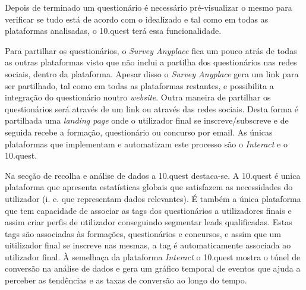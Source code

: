 Depois de terminado um questionário é necessário pré-visualizar o mesmo para verificar se tudo está de acordo com o idealizado e tal como em todas as plataformas analisadas, o 10.quest terá essa funcionalidade.

Para partilhar os questionários, o \textit{Survey Anyplace} fica um pouco atrás de todas as outras plataformas visto que não inclui a partilha dos questionários nas redes sociais, dentro da plataforma. Apesar disso o \textit{Survey Anyplace} gera um link para ser partilhado, tal como em todas as plataformas restantes, e possibilita a integração do questionário noutro \textit{website}. 
Outra maneira de partilhar os questionários será através de um link ou através das redes sociais. Desta forma é partilhada uma \textit{landing page} onde o utilizador final se inscreve/subscreve e de seguida recebe a formação, questionário ou concurso por email. As únicas plataformas que implementam e automatizam este processo são o \textit{Interact} e o 10.quest.


Na secção de recolha e análise de dados a 10.quest destaca-se. A 10.quest é unica plataforma que apresenta estatísticas globais que satisfazem as necessidades do utilizador (i. e. que representam dados relevantes). É também a única plataforma que tem capacidade de associar as tags dos questionários a utilizadores finais e assim criar perfis de utilizador conseguindo segmentar leads qualificadas. Estas tags são associadas às formações, questionários e concursos, e assim que um uitilizador final se inscreve nas mesmas, a tag é automaticamente associada ao utilizador final.  À semelhaça da plataforma \textit{Interact} o 10.quest mostra o túnel de conversão na análise de dados e gera um gráfico temporal de eventos que ajuda a perceber as tendências e as taxas de conversão ao longo do tempo.
 

\clearpage
	
